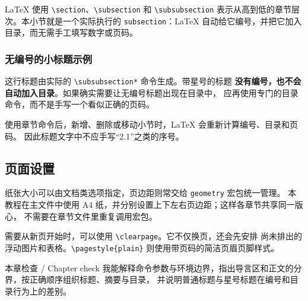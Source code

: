 LaTeX 使用 \texttt{\textbackslash section}、\texttt{\textbackslash subsection} 和
\texttt{\textbackslash subsubsection} 表示从高到低的章节层次。本小节就是一个实际执行的
\texttt{subsection}：LaTeX 自动给它编号，并把它加入目录，而无需手工填写数字或页码。

\subsubsection*{无编号的小标题示例}

这行标题由实际的 \texttt{\textbackslash subsubsection*} 命令生成。带星号的标题
\textbf{没有编号，也不会自动加入目录}。如果确实需要让无编号标题出现在目录中，
应再使用专门的目录命令，而不是手写一个看似正确的页码。

\begin{resultbox}
使用章节命令后，新增、删除或移动小节时，LaTeX 会重新计算编号、目录和页码。
因此标题文字中不应手写“2.1”之类的序号。
\end{resultbox}

\subsection{页面设置}

纸张大小可以由文档类选项指定，页边距则常交给 \texttt{geometry} 宏包统一管理。
本教程在主文件中使用 A4 纸，并分别设置上下左右页边距；这样各章节共享同一版心，
不需要在章节文件里重复调用宏包。

需要从新页开始时，可以使用 \texttt{\textbackslash clearpage}。它不仅换页，还会先安排
尚未排出的浮动图片和表格。\texttt{\textbackslash pagestyle\{plain\}} 则使用带页码的简洁页眉页脚样式。

\begin{learningbox}{本章检查 / Chapter check}
我能解释命令参数与环境边界，指出导言区和正文的分界，按正确顺序组织标题、摘要与目录，
并说明普通标题与星号标题在编号和目录行为上的差别。
\end{learningbox}
